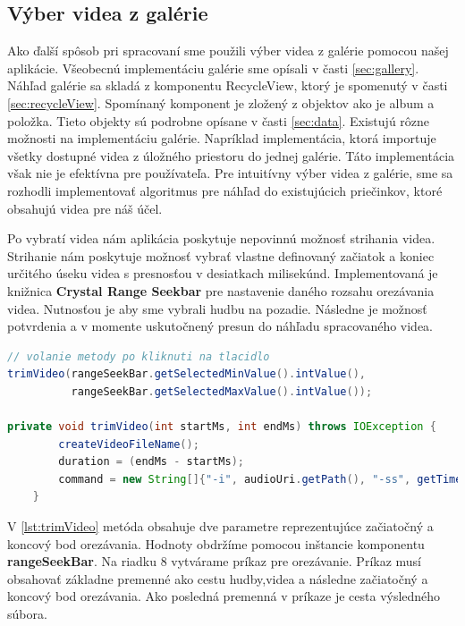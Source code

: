 \documentclass[12pt, oneside]{book}
\begin{document}
\subsection{Výber videa z galérie}

\hspace{15pt} Ako ďalší spôsob pri spracovaní sme použili výber videa z galérie pomocou našej aplikácie. Všeobecnú implementáciu galérie sme opísali v časti \ref{sec:gallery}. Náhľad galérie sa skladá z komponentu RecycleView, ktorý je spomenutý v časti \ref{sec:recycleView}. Spomínaný komponent je zložený z objektov ako je album a položka. Tieto objekty sú podrobne opísane v časti \ref{sec:data}. Existujú rôzne možnosti na implementáciu galérie. Napríklad implementácia, ktorá importuje všetky dostupné videa z úložného priestoru do jednej galérie. Táto implementácia však nie je efektívna pre používateľa. Pre intuitívny výber videa z galérie, sme sa rozhodli implementovať algoritmus pre náhľad do existujúcich priečinkov, ktoré obsahujú videa pre náš účel. 

Po vybratí videa nám aplikácia poskytuje nepovinnú možnosť strihania videa. Strihanie nám poskytuje možnosť vybrať vlastne definovaný začiatok a koniec určitého úseku videa s presnosťou v desiatkach milisekúnd. Implementovaná je knižnica \textbf{Crystal Range Seekbar} pre nastavenie daného rozsahu orezávania videa. Nutnosťou je aby sme vybrali hudbu na pozadie. Následne je možnosť potvrdenia a v momente uskutočnený presun do náhľadu spracovaného videa.

\begin{lstlisting}[language=Java, label={lst:trimVideo}, caption=Náhľad metódy pomocou ktorej vygenerujeme príkaz na orezanie videa. ]
// volanie metody po kliknuti na tlacidlo
trimVideo(rangeSeekBar.getSelectedMinValue().intValue(),
          rangeSeekBar.getSelectedMaxValue().intValue());
          
private void trimVideo(int startMs, int endMs) throws IOException {
        createVideoFileName();
        duration = (endMs - startMs);
        command = new String[]{"-i", audioUri.getPath(), "-ss", getTime(startMs), "-y", "-i", uri.getPath(),"-t",getTime(duration), "-r","25", "-c:v", "copy", "-c:a", "aac", "-shortest", mVideoFileName};
    }
\end{lstlisting}

V \autoref{lst:trimVideo} metóda obsahuje dve parametre reprezentujúce začiatočný a koncový bod orezávania. Hodnoty obdržíme pomocou inštancie komponentu \textbf{rangeSeekBar}. Na riadku 8 vytvárame príkaz pre orezávanie. Príkaz musí obsahovať základne premenné ako cestu hudby,videa a následne začiatočný a koncový bod orezávania. Ako posledná premenná v príkaze je cesta výsledného súbora.
\end{document}
